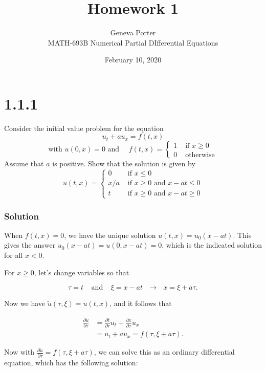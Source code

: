 \documentclass[12pt]{article}
\title{Homework 1}
\author{Geneva Porter\\ 
MATH-693B Numerical Partial DIfferential Equations\\}
\date{February 10, 2020}
\begin{document}
\maketitle

\section*{1.1.1}

Consider the initial value problem for the equation
$$
u_{t}+a u_{x}=f(t, x)
$$
$$
\text { with } u(0, x)=0 \text { and } \quad f(t, x)=\left\{\begin{array}{ll}
{1} & {\text { if } x \geq 0} \\
{0} & {\text { otherwise }}
\end{array}\right.
$$
Assume that $a$ is positive. Show that the solution is given by
$$
u(t, x)=\left\{\begin{array}{ll}
{0} & {\text { if } x \leq 0} \\
{x / a} & {\text { if } x \geq 0 \text { and } x-a t \leq 0} \\
{t} & {\text { if } x \geq 0 \text { and } x-a t \geq 0}
\end{array}\right.
$$

\subsubsection*{Solution}

When $f(t,x)=0$, we have the unique solution $u(t,x) = u_0(x-at)$. This gives the answer $u_0(x-at) = u(0, x-at) = 0$, which is the indicated solution for all $x<0$. 

For $x \geq 0$, let's change variables so that

$$ \tau=t ~~~~~\text{and} ~~~~~ \xi=x-at ~~~ \longrightarrow ~~~ x = \xi +a\tau.$$

Now we have $\tilde{u}(\tau, \xi) = u(t,x)$, and it follows that

\begin{equation*}
\begin{aligned}
	 \frac{\partial\tilde{u}}{\partial\tau} &= \frac{\partial t}{\partial\tau}u_t + \frac{\partial x}{\partial\tau}u_x\\
	 &= u_t + au_x = f(\tau, \xi+a\tau).
\end{aligned}
\end{equation*}

Now with $\frac{\partial\tilde{u}}{\partial\tau}=f(\tau, \xi+a\tau)$, we can solve this as an ordinary differential equation, which has the following solution:
\end{document}
